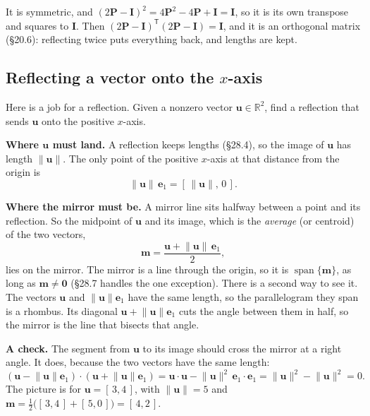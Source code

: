\documentclass[11pt]{article}
\theoremstyle{plain}
\theoremstyle{definition}
\theoremstyle{remark}
\newcommand{\R}{\mathbb{R}}
\newcommand{\vc}[1]{\mathbf{#1}}
\newcommand{\mt}[1]{\mathbf{#1}}
\newcommand{\norm}[1]{\lVert #1\rVert}
\newcommand{\T}{^{\mathsf{T}}}
\DeclareMathOperator{\spanop}{span}
\begin{document}
It is symmetric, and $(2\mt{P}-\mt{I})^{2}=4\mt{P}^{2}-4\mt{P}+\mt{I}=\mt{I}$,
so it is its own transpose and squares to $\mt{I}$. Then
$(2\mt{P}-\mt{I})\T(2\mt{P}-\mt{I})=\mt{I}$, and it is an orthogonal matrix
(\S20.6): reflecting twice puts everything back, and lengths are kept.

\subsection{Reflecting a vector onto the \texorpdfstring{$x$}{x}-axis}
Here is a job for a reflection. Given a nonzero vector $\vc{u}\in\R^{2}$, find
a reflection that sends $\vc{u}$ onto the positive $x$-axis.

\medskip
\noindent\textbf{Where $\vc{u}$ must land.} A reflection keeps lengths
(\S28.4), so the image of $\vc{u}$ has length $\norm{\vc{u}}$. The only point
of the positive $x$-axis at that distance from the origin is
\[
  \norm{\vc{u}}\,\vc{e}_1=[\,\norm{\vc{u}},\,0\,].
\]

\noindent\textbf{Where the mirror must be.} A mirror line sits halfway between
a point and its reflection. So the midpoint of $\vc{u}$ and its image, which is
the \emph{average} (or centroid) of the two vectors,
\[
  \vc{m}=\frac{\vc{u}+\norm{\vc{u}}\,\vc{e}_1}{2},
\]
lies on the mirror. The mirror is a line through the origin, so it is
$\spanop\{\vc{m}\}$, as long as $\vc{m}\neq\vc{0}$ (\S28.7 handles the one
exception). There is a second way to see it. The vectors $\vc{u}$ and
$\norm{\vc{u}}\vc{e}_1$ have the same length, so the parallelogram they span is
a rhombus. Its diagonal $\vc{u}+\norm{\vc{u}}\vc{e}_1$ cuts the angle between
them in half, so the mirror is the line that bisects that angle.

\medskip
\noindent\textbf{A check.} The segment from $\vc{u}$ to its image should cross
the mirror at a right angle. It does, because the two vectors have the same
length:
\[
  (\vc{u}-\norm{\vc{u}}\vc{e}_1)\cdot(\vc{u}+\norm{\vc{u}}\vc{e}_1)
  =\vc{u}\cdot\vc{u}-\norm{\vc{u}}^{2}\,\vc{e}_1\cdot\vc{e}_1
  =\norm{\vc{u}}^{2}-\norm{\vc{u}}^{2}=0 .
\]
The picture is for $\vc{u}=[\,3,4\,]$, with $\norm{\vc{u}}=5$ and
$\vc{m}=\frac12\bigl([\,3,4\,]+[\,5,0\,]\bigr)=[\,4,2\,]$.
\end{document}
